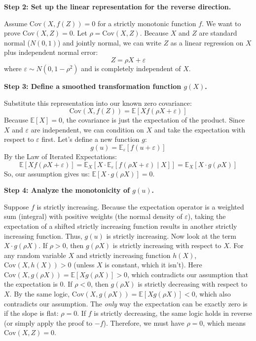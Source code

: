 \begin{solution}
\textbf{Step 2: Set up the linear representation for the reverse direction.}

Assume $\text{Cov}(X, f(Z)) = 0$ for a strictly monotonic function $f$. We want to prove $\text{Cov}(X, Z) = 0$. Let $\rho = \text{Cov}(X, Z)$.
Because $X$ and $Z$ are standard normal ($N(0,1)$) and jointly normal, we can write $Z$ as a linear regression on $X$ plus independent normal error:
\[ Z = \rho X + \varepsilon \]
where $\varepsilon \sim N(0, 1-\rho^2)$ and is completely independent of $X$.

\textbf{Step 3: Define a smoothed transformation function $g(X)$.}

Substitute this representation into our known zero covariance:
\[ \text{Cov}(X, f(Z)) = \mathbb{E}[X f(\rho X + \varepsilon)] \]
Because $\mathbb{E}[X] = 0$, the covariance is just the expectation of the product.
Since $X$ and $\varepsilon$ are independent, we can condition on $X$ and take the expectation with respect to $\varepsilon$ first. Let's define a new function $g$:
\[ g(u) = \mathbb{E}_\varepsilon[f(u + \varepsilon)] \]
By the Law of Iterated Expectations:
\[ \mathbb{E}[X f(\rho X + \varepsilon)] = \mathbb{E}_X \left[ X \cdot \mathbb{E}_\varepsilon [f(\rho X + \varepsilon) \mid X] \right] = \mathbb{E}_X [X \cdot g(\rho X)] \]
So, our assumption gives us: $\mathbb{E}[X \cdot g(\rho X)] = 0$.

\textbf{Step 4: Analyze the monotonicity of $g(u)$.}

Suppose $f$ is strictly increasing. Because the expectation operator is a weighted sum (integral) with positive weights (the normal density of $\varepsilon$), taking the expectation of a shifted strictly increasing function results in another strictly increasing function. Thus, $g(u)$ is strictly increasing.
Now look at the term $X \cdot g(\rho X)$.
If $\rho > 0$, then $g(\rho X)$ is strictly increasing with respect to $X$. For any random variable $X$ and strictly increasing function $h(X)$, $\text{Cov}(X, h(X)) > 0$ (unless $X$ is constant, which it isn't). Here $\text{Cov}(X, g(\rho X)) = \mathbb{E}[X g(\rho X)] > 0$, which contradicts our assumption that the expectation is 0.
If $\rho < 0$, then $g(\rho X)$ is strictly decreasing with respect to $X$. By the same logic, $\text{Cov}(X, g(\rho X)) = \mathbb{E}[X g(\rho X)] < 0$, which also contradicts our assumption.
The \textit{only} way the expectation can be exactly zero is if the slope is flat: $\rho = 0$.
If $f$ is strictly decreasing, the same logic holds in reverse (or simply apply the proof to $-f$).
Therefore, we must have $\rho = 0$, which means $\text{Cov}(X, Z) = 0$.
\end{solution}

